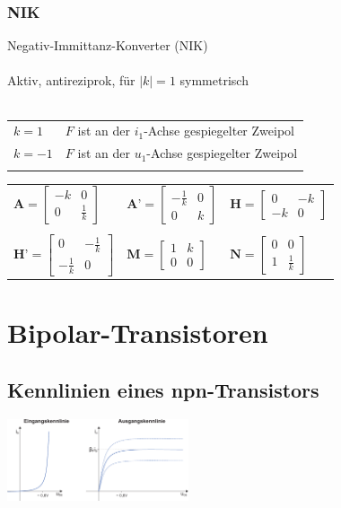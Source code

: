 \documentclass[a4paper,twocolumn,10pt]{article}
\begin{document}
\subsubsection*{NIK}
Negativ-Immittanz-Konverter (NIK)\\\\
Aktiv, antireziprok, für $|k|=1$ symmetrisch\\\\
\begin{tabular}{ll}
$k=1$ & $F$ ist an der $i_1$-Achse gespiegelter Zweipol\\
$k=-1$ & $F$ ist an der $u_1$-Achse gespiegelter Zweipol\\\\
\end{tabular}
\begin{tabular}{lll}
$\textbf{A}=\begin{bmatrix}-k & 0\\ 0 & \frac{1}{k}\end{bmatrix}$ & $\textbf{A'}=\begin{bmatrix}-\frac{1}{k} & 0\\ 0 & k\end{bmatrix}$ & $\textbf{H}=\begin{bmatrix}0 & -k\\ -k & 0\end{bmatrix}$\\\\
$\textbf{H'}=\begin{bmatrix}0 & -\frac{1}{k}\\ -\frac{1}{k} & 0\end{bmatrix}$ & $\textbf{M}=\begin{bmatrix}1 & k\\ 0 & 0\end{bmatrix}$ & $\textbf{N}=\begin{bmatrix}0 & 0\\ 1 & \frac{1}{k}\end{bmatrix}$
\end{tabular}

\section*{Bipolar-Transistoren}
\subsection*{Kennlinien eines npn-Transistors}
\includegraphics[width=0.4\textwidth]{Grafiken/Kennlinie_Transistor}
\end{document}
